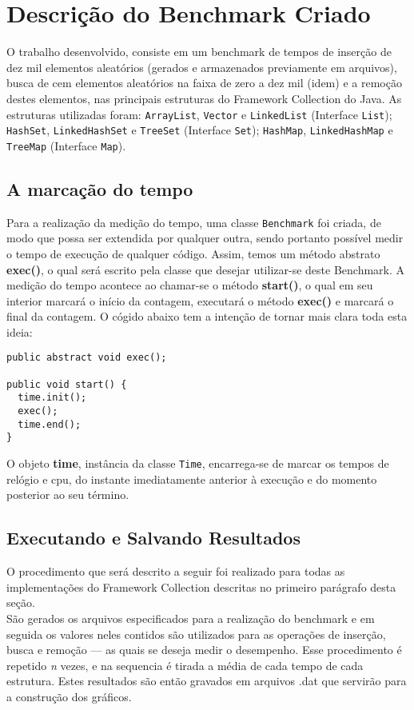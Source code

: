 \section{Descrição do Benchmark Criado} \label{sec:desc_bench}
	O trabalho desenvolvido, consiste em um benchmark de tempos de inserção de dez mil elementos aleatórios (gerados e armazenados previamente em arquivos), busca de cem elementos aleatórios na faixa de zero a dez mil (idem) e a remoção destes elementos, nas principais estruturas do Framework Collection do Java. As estruturas utilizadas foram: \texttt{ArrayList}, \texttt{Vector} e \texttt{LinkedList} (Interface \texttt{List}); \texttt{HashSet}, \texttt{LinkedHashSet} e \texttt{TreeSet} (Interface \texttt{Set}); \texttt{HashMap}, \texttt{LinkedHashMap} e \texttt{TreeMap} (Interface \texttt{Map}).\\
\subsection{A marcação do tempo}
	Para a realização da medição do tempo, uma classe \texttt{Benchmark} foi criada, de modo que possa ser extendida por qualquer outra, sendo portanto possível medir o tempo de execução de qualquer código. Assim, temos um método abstrato \textbf{exec()}, o qual será escrito pela classe que desejar utilizar-se deste Benchmark. A medição do tempo acontece ao chamar-se o método \textbf{start()}, o qual em seu interior marcará o início da contagem, executará o método \textbf{exec()} e marcará o final da contagem. O cógido abaixo tem a intenção de tornar mais clara toda esta ideia:\\
	\begin{verbatim}
public abstract void exec();

public void start() {
  time.init();
  exec();
  time.end();
}
	\end{verbatim}
	O objeto \textbf{time}, instância da classe \texttt{Time}, encarrega-se de marcar os tempos de relógio e cpu, do instante imediatamente anterior à execução e do momento posterior ao seu término.\\
\subsection{Executando e Salvando Resultados}
	O procedimento que será descrito a seguir foi realizado para todas as implementações do Framework Collection descritas no primeiro parágrafo desta seção.\\
	São gerados os arquivos especificados para a realização do benchmark e em seguida os valores neles contidos são utilizados para as operações de inserção, busca e remoção --- as quais se deseja medir o desempenho. Esse procedimento é repetido \textsl{n} vezes, e na sequencia é tirada a média de cada tempo de cada estrutura. Estes resultados são então gravados em arquivos .dat que servirão para a construção dos gráficos.
